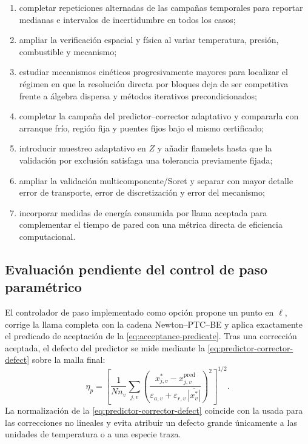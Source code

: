 \documentclass[12pt,a4paper,twoside,openany]{book}
\newcommand{\abs}[1]{\left\lvert #1\right\rvert}
\begin{document}
\begin{enumerate}
  \item completar repeticiones alternadas de las campañas temporales para
        reportar medianas e intervalos de incertidumbre en todos los casos;
  \item ampliar la verificación espacial y física al variar temperatura,
        presión, combustible y mecanismo;
  \item estudiar mecanismos cinéticos progresivamente mayores para localizar el
        régimen en que la resolución directa por bloques deja de ser competitiva
        frente a álgebra dispersa y métodos iterativos precondicionados;
  \item completar la campaña del predictor--corrector adaptativo y compararla
        con arranque frío, región fija y puentes fijos bajo el mismo certificado;
  \item introducir muestreo adaptativo en \(Z\) y añadir flamelets hasta que
        la validación por exclusión satisfaga una tolerancia previamente fijada;
  \item ampliar la validación multicomponente/Soret y separar con mayor detalle
        error de transporte, error de discretización y error del mecanismo;
  \item incorporar medidas de energía consumida por llama aceptada para
        complementar el tiempo de pared con una métrica directa de eficiencia
        computacional.
\end{enumerate}

\subsection{Evaluación pendiente del control de paso paramétrico}
\label{sec:future-adaptive-pc}

El controlador de paso implementado como opción propone un punto en \(\ell\), corrige la
llama completa con la cadena Newton--PTC--BE y aplica exactamente el predicado de
aceptación de la \cref{eq:acceptance-predicate}. Tras una corrección aceptada, el
defecto del predictor se mide mediante la \cref{eq:predictor-corrector-defect} sobre la malla final:
\begin{equation}
  \eta_p=\left[\frac{1}{Nn_v}\sum_{j,v}
  \left(\frac{x_{j,v}^*-x_{j,v}^{\mathrm{pred}}}
  {\varepsilon_{a,v}+\varepsilon_{r,v}\,\overline{\abs{x_v^*}}}\right)^2
  \right]^{1/2}.
  \label{eq:predictor-corrector-defect}
\end{equation}
La normalización de la \cref{eq:predictor-corrector-defect} coincide con la usada
para las correcciones no lineales y evita atribuir un defecto grande únicamente a
las unidades de temperatura o a una especie traza.
\end{document}
